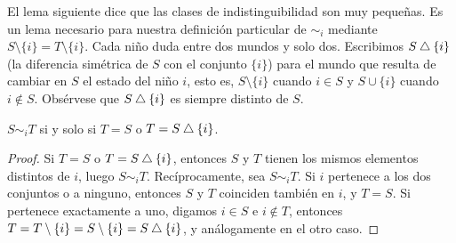 El lema siguiente dice que las clases de indistinguibilidad son muy pequeñas. Es un lema necesario para nuestra definición particular de $\sim_i$ mediante $S \setminus \{i\} = T \setminus \{i\}$. Cada niño duda entre dos mundos y solo dos. Escribimos $S \mathbin{\triangle} \{i\}$ (la diferencia simétrica de $S$ con el conjunto $\{i\}$) para el mundo que resulta de cambiar en $S$ el estado del niño $i$, esto es, $S \setminus \{i\}$ cuando $i \in S$ y $S \cup \{i\}$ cuando $i \notin S$. Obsérvese que $S \mathbin{\triangle} \{i\}$ es siempre distinto de $S$.

\begin{lema}[Vecinos]\label{lema:vecinos}
$S \sim_i T$ si y solo si $T = S$ o $T = S \mathbin{\triangle} \{i\}$.
\end{lema}

\begin{proof}
Si $T = S$ o $T = S \mathbin{\triangle} \{i\}$, entonces $S$ y $T$ tienen los mismos elementos distintos de $i$, luego $S \sim_i T$. Recíprocamente, sea $S \sim_i T$. Si $i$ pertenece a los dos conjuntos o a ninguno, entonces $S$ y $T$ coinciden también en $i$, y $T = S$. Si pertenece exactamente a uno, digamos $i \in S$ e $i \notin T$, entonces $T = T \setminus \{i\} = S \setminus \{i\} = S \mathbin{\triangle} \{i\}$, y análogamente en el otro caso.
\end{proof}

